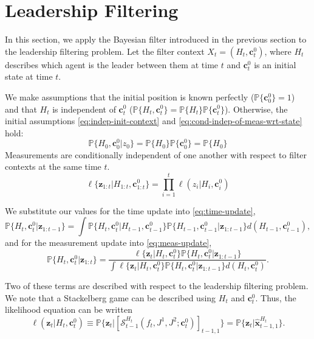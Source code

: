 \documentclass[11pt]{article}
\newcommand\stack[2]{\mathcal{S}^{#1}_{#2}}
\newcommand\costfn[1]{J^{#1}}
\newcommand\obs[1]{\bm{z}_{#1}}
\newcommand\prob[1]{\mathbb{P}{\{#1\}}}
\newcommand\lkhd[1]{\ell{\{#1\}}}
\newcommand\stackmeas[2]{\bm{\hat{x}}^{#1}_{#2}}
\newcommand\initcond[1]{\bm{c}^{0}_{#1}}
\newcommand\comment[1]{\textcolor{purple}{#1}}
\begin{document}
\section{Leadership Filtering}
In this section, we apply the Bayesian filter introduced in the previous section to the leadership filtering problem. Let the filter context $X_t = (H_t, \initcond{t})$, where $H_t$ describes which agent is the leader between them at time $t$ and $\initcond{t}$ is an initial state at time $t$. 



We make assumptions that the initial position is known perfectly ($\prob{\initcond{0}} = 1$) and that $H_t$ is independent of $\initcond{t}$ ($\prob{H_t, \initcond{t}} = \prob{H_t}\prob{\initcond{t}}$). Otherwise, the initial assumptions \ref{eq:indep-init-context} and \ref{eq:cond-indep-of-meas-wrt-state} hold:
\begin{equation}
\prob{H_0, \initcond{0} | z_0} = \prob{H_0}\prob{\initcond{0}} = \prob{H_0}
\end{equation}
Measurements are conditionally independent of one another with respect to filter contexts at the same time $t$.
\begin{equation}
\lkhd{\obs{1:t} | H_{1:t}, \initcond{1:t}} = \prod_{i=1}^t \ell(z_i | H_i, \initcond{i})
\end{equation}


We substitute our values for the time update into \ref{eq:time-update},
\begin{equation}
\prob{H_t, \initcond{t} | \obs{1:t-1}} = \int \prob{H_t, \initcond{t} | H_{t-1}, \initcond{t-1}} \prob{H_{t-1}, \initcond{t-1} | \obs{1:t-1}} d(H_{t-1}, \initcond{{}t-1}),
\end{equation}
and for the measurement update into \ref{eq:meas-update},
\begin{equation}
\prob{H_t, \initcond{t} | \obs{1:t}} = \frac{\lkhd{\obs{t} | H_t, \initcond{t}} \prob{H_t, \initcond{t} | \obs{1:t-1}}}{\int \lkhd{\obs{t} | H_t, \initcond{t}} \prob{H_t, \initcond{t} | \obs{1:t-1}}  d(H_t, \initcond{t})}.
\end{equation}


Two of these terms are described with respect to the leadership filtering problem. We note that a Stackelberg game can be described using $H_t$ and $\initcond{t}$. Thus, the likelihood equation can be written
\begin{equation}
\ell(\obs{t} | H_t, \initcond{t}) \equiv \prob{\obs{t} | \left[ \stack{H_{t}}{t-1}\left(f_t, \costfn{1}, \costfn{2}; \initcond{t} \right) \right]_{t-1, 1}} = \prob{\obs{t} | \stackmeas{H_t}{t-1, 1}}.
\end{equation}
\end{document}

